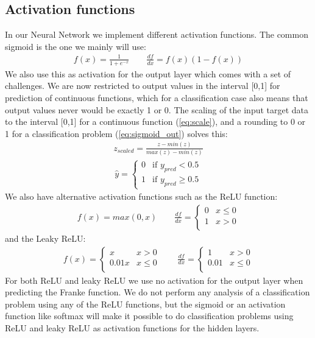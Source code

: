 \documentclass[11pt]{article}
\begin{document}
\subsection{Activation functions}
In our Neural Network we implement different activation functions. The common sigmoid is the one we mainly will use:
\begin{align*}
  f(x) = \frac{1 }{1 + e^{-x}} \quad\quad \frac{d f }{dx} = f(x) (1 - f(x))
\end{align*}
We also use this as activation for the output layer which comes with a set of challenges. We are now restricted to output values in the interval [0,1] for prediction of continuous functions, which for a classification case also means that output values never would be exactly 1 or 0. The scaling of the input target data to the interval [0,1] for a continuous function (\ref{eq:scale}), and a rounding to 0 or 1 for a classification problem (\ref{eq:sigmoid_out}) solves this:
\begin{align}
  \label{eq:scale}
  z_{scaled} = \frac{z- min(z)}{max(z)- min(z)}
\end{align}
\begin{align}
  \label{eq:sigmoid_out}
  \hat{y} =
  \begin{cases}
    0 & \text{if } y_{pred} < 0.5    \\
    1 & \text{if } y_{pred} \geq 0.5
  \end{cases}
\end{align}
We also have alternative activation functions such as the ReLU function:
\begin{align*}
  f(x) = max(0, x) \quad\quad \frac{df }{dx} =
  \begin{cases}
    0 & x\leq 0 \\
    1 & x > 0   \\
  \end{cases}
\end{align*}
and the Leaky ReLU:
\begin{align*}
  f(x) =
  \begin{cases}
    x     & x > 0    \\
    0.01x & x \leq 0 \\
  \end{cases}
  \quad\quad \frac{df }{dx} =
  \begin{cases}
    1    & x > 0    \\
    0.01 & x \leq 0 \\
  \end{cases}
\end{align*}
For both ReLU and leaky ReLU we use no activation for the output layer when predicting the Franke function. We do not perform any analysis of a classification problem using any of the ReLU functions, but the sigmoid or an activation function like softmax will make it possible to do classification problems using ReLU and leaky ReLU as activation functions for the hidden layers.
\end{document}

